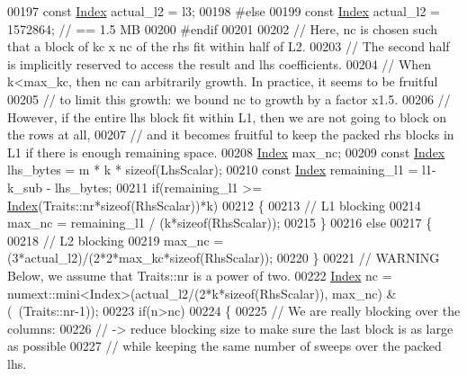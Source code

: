 \begin{DoxyCode}
00197     \textcolor{keyword}{const} \hyperlink{namespace_eigen_a62e77e0933482dafde8fe197d9a2cfde}{Index} actual\_l2 = l3;
00198 \textcolor{preprocessor}{    #else}
00199     \textcolor{keyword}{const} \hyperlink{namespace_eigen_a62e77e0933482dafde8fe197d9a2cfde}{Index} actual\_l2 = 1572864; \textcolor{comment}{// == 1.5 MB}
00200 \textcolor{preprocessor}{    #endif}
00201 
00202     \textcolor{comment}{// Here, nc is chosen such that a block of kc x nc of the rhs fit within half of L2.}
00203     \textcolor{comment}{// The second half is implicitly reserved to access the result and lhs coefficients.}
00204     \textcolor{comment}{// When k<max\_kc, then nc can arbitrarily growth. In practice, it seems to be fruitful}
00205     \textcolor{comment}{// to limit this growth: we bound nc to growth by a factor x1.5.}
00206     \textcolor{comment}{// However, if the entire lhs block fit within L1, then we are not going to block on the rows at all,}
00207     \textcolor{comment}{// and it becomes fruitful to keep the packed rhs blocks in L1 if there is enough remaining space.}
00208     \hyperlink{namespace_eigen_a62e77e0933482dafde8fe197d9a2cfde}{Index} max\_nc;
00209     \textcolor{keyword}{const} \hyperlink{namespace_eigen_a62e77e0933482dafde8fe197d9a2cfde}{Index} lhs\_bytes = m * k * \textcolor{keyword}{sizeof}(LhsScalar);
00210     \textcolor{keyword}{const} \hyperlink{namespace_eigen_a62e77e0933482dafde8fe197d9a2cfde}{Index} remaining\_l1 = l1- k\_sub - lhs\_bytes;
00211     \textcolor{keywordflow}{if}(remaining\_l1 >= \hyperlink{namespace_eigen_a62e77e0933482dafde8fe197d9a2cfde}{Index}(Traits::nr*\textcolor{keyword}{sizeof}(RhsScalar))*k)
00212     \{
00213       \textcolor{comment}{// L1 blocking}
00214       max\_nc = remaining\_l1 / (k*\textcolor{keyword}{sizeof}(RhsScalar));
00215     \}
00216     \textcolor{keywordflow}{else}
00217     \{
00218       \textcolor{comment}{// L2 blocking}
00219       max\_nc = (3*actual\_l2)/(2*2*max\_kc*\textcolor{keyword}{sizeof}(RhsScalar));
00220     \}
00221     \textcolor{comment}{// WARNING Below, we assume that Traits::nr is a power of two.}
00222     \hyperlink{namespace_eigen_a62e77e0933482dafde8fe197d9a2cfde}{Index} nc = numext::mini<Index>(actual\_l2/(2*k*\textcolor{keyword}{sizeof}(RhsScalar)), max\_nc) & (~(Traits::nr-1));
00223     \textcolor{keywordflow}{if}(n>nc)
00224     \{
00225       \textcolor{comment}{// We are really blocking over the columns:}
00226       \textcolor{comment}{// -> reduce blocking size to make sure the last block is as large as possible}
00227       \textcolor{comment}{//    while keeping the same number of sweeps over the packed lhs.}

\end{DoxyCode}
